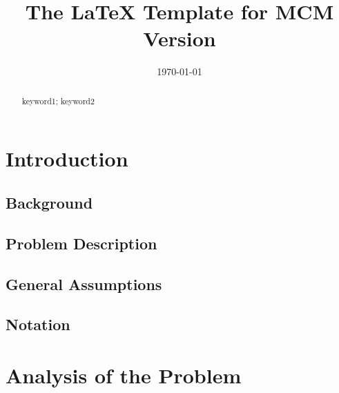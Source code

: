 \documentclass{mcmthesis}
\title{The \LaTeX{} Template for MCM Version \MCMversion}
\date{\today}
\begin{document}
\begin{abstract}
\lipsum[1]
\begin{keywords}
keyword1; keyword2
\end{keywords}
\end{abstract}
\maketitle
\tableofcontents
\section{Introduction}
	
	\subsection{Background}
	
	\subsection{Problem Description}
	
	\subsection{General Assumptions}
		
	\subsection{Notation}


\section{Analysis of the Problem}
\end{document}
